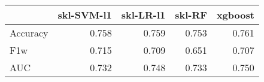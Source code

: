 \begin{tabular}{lrrrr}
\toprule
{} &  skl-SVM-l1 &  skl-LR-l1 &  skl-RF &  xgboost \\
\midrule
Accuracy &       0.758 &      0.759 &   0.753 &    0.761 \\
F1w      &       0.715 &      0.709 &   0.651 &    0.707 \\
AUC      &       0.732 &      0.748 &   0.733 &    0.750 \\
\bottomrule
\end{tabular}
